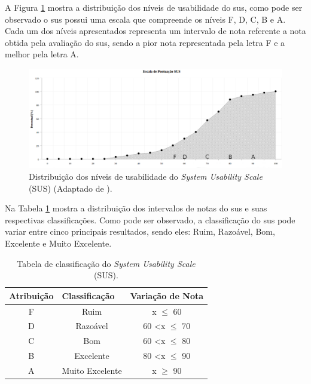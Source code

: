 A Figura \ref{escala-sus} mostra a distribuição dos níveis de usabilidade do  \acrshort{sus}, como pode ser observado o  \acrshort{sus} possui uma escala que compreende os níveis F, D, C, B e A. Cada um dos níveis apresentados representa um intervalo de nota referente a nota obtida pela avaliação do  \acrshort{sus}, sendo a pior nota representada pela letra F e a melhor pela letra A.

\begin{figure}[H]
 \centering
 \includegraphics[width=1\textwidth]{figuras/escala_sus.png} 
 \caption{Distribuição dos níveis de usabilidade do \textit{System Usability Scale} (SUS) (Adaptado de \cite{bangor2009determining}).}
 \label{escala-sus} 
\end{figure}

Na Tabela \ref{tabela-sus} mostra a distribuição dos intervalos de notas do  \acrshort{sus} e suas respectivas classificações. Como pode ser observado, a classificação do  \acrshort{sus} pode variar entre cinco principais resultados, sendo eles: Ruim, Razoável, Bom, Excelente e Muito Excelente.

\begin{table}[H]
    \centering
    \small
    \begin{tabular}{|c|c|c|}
    \hline
    \multicolumn{1}{|l|}{Atribuição} & \multicolumn{1}{l|}{Classificação} & \multicolumn{1}{l|}{Variação de Nota} \\ \hline
    F                                & Ruim                               & x $\leq $ 60                        \\ \hline
    D                                & Razoável                           & 60  \textless x $\leq$ 70          \\ \hline
    C                                & Bom                                & 60 \textless x $\leq$ 80           \\ \hline
    B                                & Excelente                          & 80 \textless x $\leq$ 90           \\ \hline
    A                                & Muito Excelente                    & x $\geq$ 90                     \\ \hline
    \end{tabular}
    \caption{Tabela de classificação do \textit{System Usability Scale} (SUS).}
    \label{tabela-sus}
\end{table}

